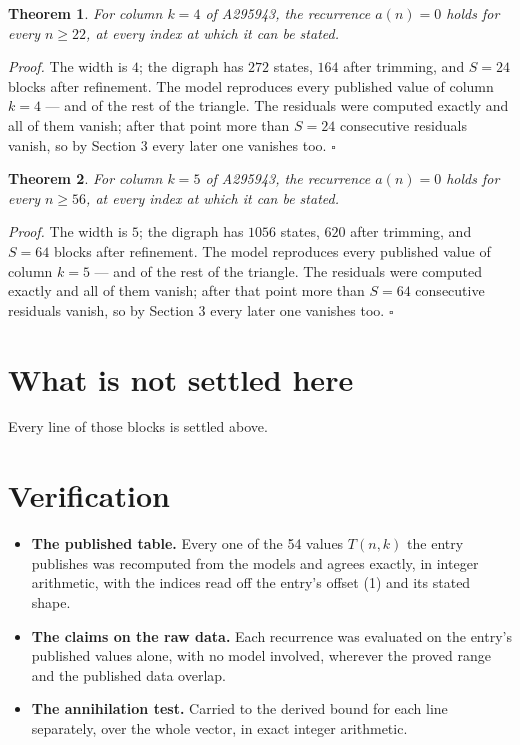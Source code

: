 \documentclass[11pt]{article}
\newtheorem{theorem}{Theorem}
\theoremstyle{definition}
\begin{document}
\begin{theorem} For column $k = 4$ of A295943, the recurrence $a(n) = 0$ holds for every $n \ge 22$, at every index at which it can be stated.\end{theorem}

{\itshape Proof.} The width is $4$; the digraph has $272$ states, $164$ after trimming, and $S = 24$ blocks after refinement. The model reproduces every published value of column $k = 4$ --- and of the rest of the triangle. The residuals were computed exactly and all of them vanish; after that point more than $S = 24$ consecutive residuals vanish, so by Section 3 every later one vanishes too. $\square$

\begin{theorem} For column $k = 5$ of A295943, the recurrence $a(n) = 0$ holds for every $n \ge 56$, at every index at which it can be stated.\end{theorem}

{\itshape Proof.} The width is $5$; the digraph has $1056$ states, $620$ after trimming, and $S = 64$ blocks after refinement. The model reproduces every published value of column $k = 5$ --- and of the rest of the triangle. The residuals were computed exactly and all of them vanish; after that point more than $S = 64$ consecutive residuals vanish, so by Section 3 every later one vanishes too. $\square$

\section{What is not settled here}

Every line of those blocks is settled above.

\section{Verification}

\begin{itemize}

\item {\bfseries The published table.} Every one of the 54 values $T(n,k)$ the entry publishes was recomputed from the models and agrees exactly, in integer arithmetic, with the indices read off the entry's offset (1) and its stated shape.

\item {\bfseries The claims on the raw data.} Each recurrence was evaluated on the entry's published values alone, with no model involved, wherever the proved range and the published data overlap.

\item {\bfseries The annihilation test.} Carried to the derived bound for each line separately, over the whole vector, in exact integer arithmetic.

\end{itemize}
\end{document}
